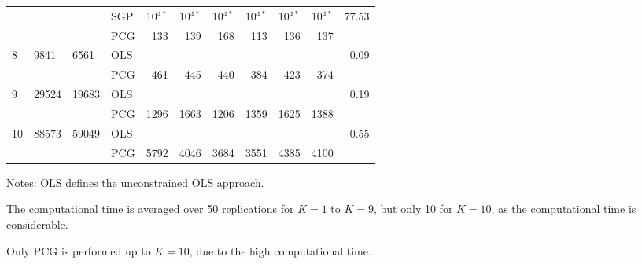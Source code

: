 \documentclass[11pt]{article}
\newcommand{\0}{\phantom{0}}
\begin{document}
\begin{table}[ht]
\begin{threeparttable}
\begin{tabular}{llllrrrrrrr}
			& & & SGP & 10$^{4*}$ & 10$^{4*}$ & 10$^{4*}$ & 10$^{4*}$ & 10$^{4*}$ & 10$^{4*}$ & 77.53 \\
			& & & PCG & 133 & 139 & 168 & 113 & 136 & 137 & \bm{$4.48$} \\
			\midrule
			8 & 9841 & 6561 & OLS & & & & & & & 0.09 \\
			& & & PCG & 461 & 445 & 440 & 384 & 423 & 374 & \bm{$26.25$} \\
			\midrule
			9 & 29524 & 19683 & OLS & & & & & & & 0.19 \\
			& & & PCG & 1296 & 1663 & 1206 & 1359 & 1625 & 1388 & \bm{$227.40$} \\
			\midrule
			10 & 88573 & 59049 & OLS & & & & & & & 0.55 \\
			& & & PCG & 5792 & 4046 & 3684 & 3551 & 4385 & 4100 & \bm{$3274.80$}\\
			\bottomrule
		\end{tabular}
		\begin{tablenotes}
			\item [] Notes: OLS defines the unconstrained OLS approach.
			\item [] The computational time is averaged over 50 replications for $K = 1$ to $K = 9$, but only 10 for $K = 10$, as the computational time is considerable.
			\item [] Only PCG is performed up to $K = 10$, due to the high computational time.
		\end{tablenotes}
	\end{threeparttable}
\end{table}
\end{document}
